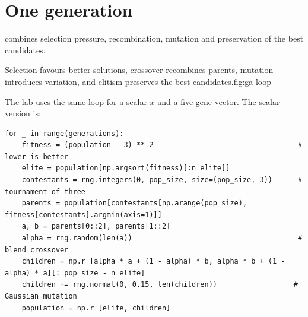 \section{One generation}

 combines selection pressure, recombination, mutation and preservation of the best candidates.

\begin{utpfig}{Selection favours better solutions, crossover recombines parents, mutation introduces variation, and elitism preserves the best candidates.}{fig:ga-loop}
\end{utpfig}

The lab uses the same loop for a scalar $x$ and a five-gene vector. The scalar version is:

\begin{lstlisting}[style=utppython]
for _ in range(generations):
    fitness = (population - 3) ** 2                                  # lower is better
    elite = population[np.argsort(fitness)[:n_elite]]
    contestants = rng.integers(0, pop_size, size=(pop_size, 3))      # tournament of three
    parents = population[contestants[np.arange(pop_size), fitness[contestants].argmin(axis=1)]]
    a, b = parents[0::2], parents[1::2]
    alpha = rng.random(len(a))                                       # blend crossover
    children = np.r_[alpha * a + (1 - alpha) * b, alpha * b + (1 - alpha) * a][: pop_size - n_elite]
    children += rng.normal(0, 0.15, len(children))                  # Gaussian mutation
    population = np.r_[elite, children]
\end{lstlisting}

